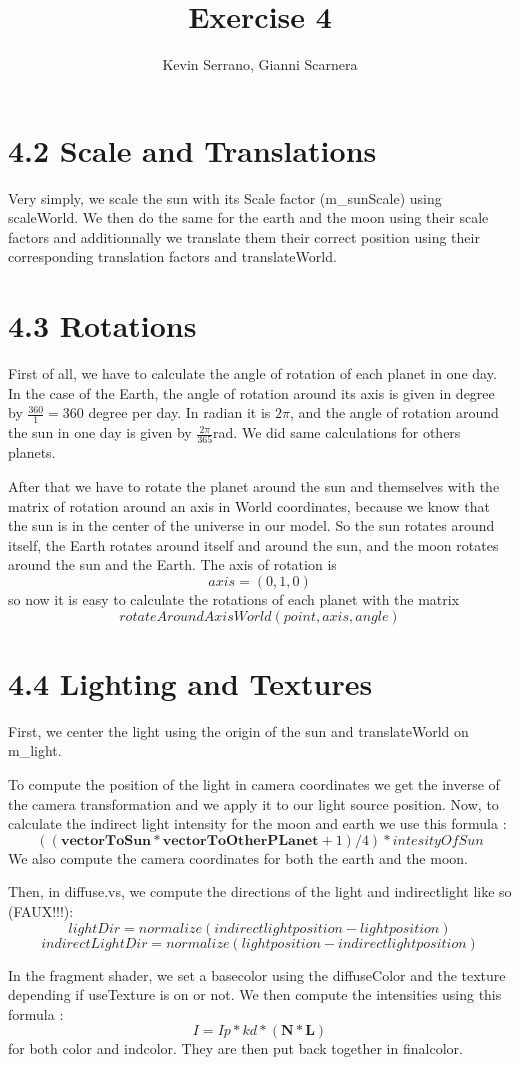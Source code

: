 \documentclass[10pt,a4paper]{report}
\author{Kevin Serrano, Gianni Scarnera}
\title{Exercise 4}
\begin{document}
\maketitle

\section*{4.2   Scale and Translations}
Very simply, we scale the sun with its Scale factor (m\_sunScale) using scaleWorld. We then do the same for the earth and the moon using their scale factors and additionnally we translate them their correct position using their corresponding translation factors and translateWorld.

\section*{4.3   Rotations}
First of all, we have to calculate the angle of rotation of each planet in one day. In the case of the Earth, the angle of rotation around its axis is given in degree by $\frac{360}{1} = 360$ degree per day. In radian it is $2 \pi$, and the angle of rotation around the sun in one day is given by $\frac{2 \pi}{365} $rad. We did same calculations for others planets.

After that we have to rotate the planet around the sun and themselves with the matrix of rotation around an axis in World coordinates, because we know that the sun is in the center of the universe in our model. So the sun rotates around itself, the Earth rotates around itself and around the sun, and the moon rotates around the sun and the Earth. The axis of rotation is $$axis = (0,1,0)$$ so now it is easy to calculate the rotations of each planet with the matrix $$rotateAroundAxisWorld(point,axis,angle)$$

\section*{4.4   Lighting and Textures}
First, we center the light using the origin of the sun and translateWorld on m\_light.

To compute the position of the light in camera coordinates we get the inverse of the camera transformation and we apply it to our light source position. Now, to calculate the indirect light intensity for the moon and earth we use this formula : $$((\mathbf{vectorToSun} * \mathbf{vectorToOtherPLanet} + 1)/4)*intesityOfSun$$
We also compute the camera coordinates for both the earth and the moon.

Then, in diffuse.vs, we compute the directions of the light and indirectlight like so (FAUX!!!):
$$lightDir = normalize(indirectlightposition - lightposition)$$
$$indirectLightDir = normalize(lightposition - indirectlightposition)$$

In the fragment shader, we set a basecolor using the diffuseColor and the texture depending if useTexture is on or not. We then compute the intensities using this formula : $$I = Ip * kd * (\mathbf{N} * \mathbf{L})$$
for both color and indcolor. They are then put back together in finalcolor.
\end{document}
